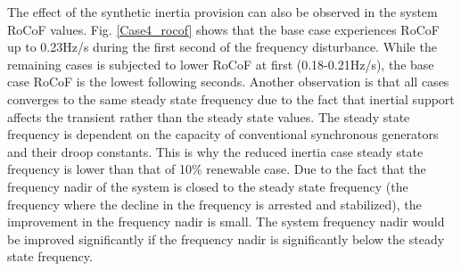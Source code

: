 The effect of the synthetic inertia provision can also be observed in the system RoCoF values. Fig. \ref{Case4_rocof} shows that the base case experiences RoCoF up to 0.23Hz/s during the first second of the frequency disturbance. While the remaining cases is subjected to lower RoCoF at first (0.18-0.21Hz/s), the base case RoCoF is the lowest following seconds. Another observation is that all cases converges to the same steady state frequency due to the fact that inertial support affects the transient rather than the steady state values. The steady state frequency is dependent on the capacity of conventional synchronous generators and their droop constants. This is why the reduced inertia case steady state frequency is lower than that of 10\% renewable case. Due to the fact that the frequency nadir of the system is closed to the steady state frequency (the frequency where the decline in the frequency is arrested and stabilized), the improvement in the frequency nadir is small. The system frequency nadir would be improved significantly if the frequency nadir is significantly below the steady state frequency. 
